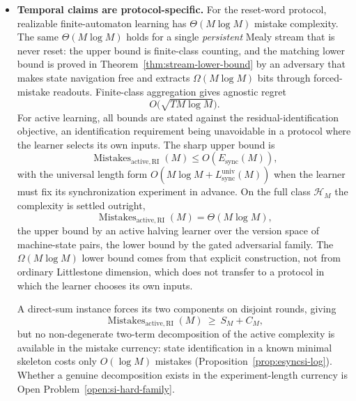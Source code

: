 \documentclass[12pt]{article}
\theoremstyle{definition}
\newcommand{\Lsyncu}{L_{\mathrm{sync}}^{\mathrm{univ}}}
\newcommand{\Esync}{E_{\mathrm{sync}}}
\newcommand{\MistRI}{\operatorname{Mistakes}_{\mathrm{active,RI}}}
\begin{document}
\begin{itemize}[leftmargin=1.8em]
\item \textbf{Temporal claims are protocol-specific.}
For the reset-word protocol, realizable finite-automaton learning has
$\Theta(M\log M)$ mistake complexity.  The same $\Theta(M\log M)$ holds for a
single \emph{persistent} Mealy stream that is never reset: the upper bound is
finite-class counting, and the matching lower bound is proved in
Theorem~\ref{thm:stream-lower-bound} by an adversary that makes state
navigation free and extracts $\Omega(M\log M)$ bits through forced-mistake
readouts.  Finite-class aggregation gives agnostic regret
\[
O\bigl(\sqrt{T M\log M}\bigr).
\]
For active learning, all bounds are stated against the residual-identification
objective, an identification requirement being unavoidable in a protocol where
the learner selects its own inputs.  The sharp upper bound is
\[
\MistRI(M)
\le
O(\Esync(M)),
\]
with the universal length form $O(M\log M+\Lsyncu(M))$ when the learner must
fix its synchronization experiment in advance.  On the full class
$\mathcal H_M$ the complexity is settled outright,
\[
\MistRI(M)
=
\Theta(M\log M),
\]
the upper bound by an active halving learner over the version space of
machine-state pairs, the lower bound by the gated adversarial family.  The
$\Omega(M\log M)$ lower bound comes from that explicit construction,
not from ordinary Littlestone dimension, which does not transfer to a protocol
in which the learner chooses its own inputs.

A direct-sum instance forces its two components on disjoint rounds, giving
\[
\MistRI(M)\ \ge\ S_M+C_M,
\]
but no non-degenerate two-term decomposition of the
active complexity is available in the mistake currency: state identification in
a known minimal skeleton costs only $O(\log M)$ mistakes
(Proposition~\ref{prop:esyncsi-log}).  Whether a genuine decomposition exists
in the experiment-length currency is
Open Problem~\ref{open:si-hard-family}.


\end{itemize}
\end{document}
